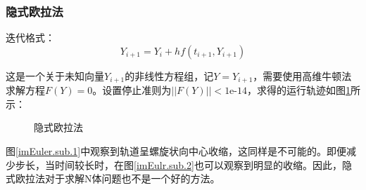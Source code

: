 \documentclass{article}
\begin{document}
\subsubsection{隐式欧拉法} 
\par 迭代格式：
$$
Y_{i+1} = Y_i + hf(t_{i+1},Y_{i+1})$$
\par 这是一个关于未知向量$Y_{i+1}$的非线性方程组，记$Y=Y_{i+1}$，需要使用高维牛顿法求解方程$F(Y)=0$。设置停止准则为$||F(Y)||<\text{1e-14}$，求得的运行轨迹如图\ref{imEuler.main}所示：
\begin{figure}[H]
	\centering  %
	\caption{隐式欧拉法}
	\label{imEuler.main}
\end{figure}
\par 图\ref{imEuler.sub.1}中观察到轨道呈螺旋状向中心收缩，这同样是不可能的。即便减少步长，当时间较长时，在图\ref{imEulr.sub.2}也可以观察到明显的收缩。因此，隐式欧拉法对于求解N体问题也不是一个好的方法。
\end{document}

